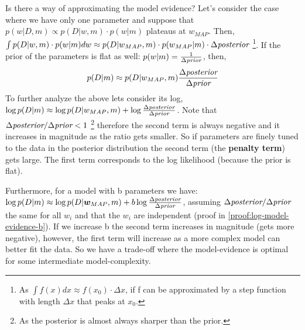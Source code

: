 Is there a way of approximating the model evidence? Let's consider the case where we have only one parameter and suppose that $p(w|D,m) \propto p(D|w,m) \cdot p(w|m)$ plateaus at $w_{MAP}$. Then, $\int p(D|w,m) \cdot p(w|m) dw \approx p(D| w_{MAP} , m) \cdot p(w_{MAP} |m) \cdot \Delta \textit{posterior}$ \footnote{As $\int f(x) dx \approx f(x_{0}) \cdot \Delta x$, if f can be approximated by a step function with length $\Delta x$ that peaks at $x_{0}$.}. If the prior of the parameters is flat as well: $p(w |m) = \frac{1}{\Delta \textit{prior}}$, then, 
\begin{equation}
    p(D|m) \approx p(D| w_{MAP} , m) \frac{\Delta \textit{posterior}}{\Delta \textit{prior}}
\end{equation}
To further analyze the above lets consider its log, $\log p(D|m) \approx \log p(D| w_{MAP} , m) + \log \frac{\Delta \textit{posterior}}{\Delta \textit{prior}}$. Note that $\Delta \textit{posterior} / \Delta \textit{prior} < 1$ \footnote{As the posterior is almost always sharper than the prior.} therefore the second term is always negative and it increases in magnitude as the ratio gets smaller. So if parameters are finely tuned to the data in the posterior distribution the second term (the \textbf{penalty term}) gets large. The first term corresponds to the log likelihood (because the prior is flat).

Furthermore, for a model with b parameters we have: $\log p(D|m) \approx \log p(D| \bm{w}_{MAP} , m) + b \log \frac{\Delta \textit{posterior}}{\Delta \textit{prior}}$, assuming $\Delta \textit{posterior} / \Delta \textit{prior}$ the same for all $w_{i}$ and that the $w_{i}$ are independent (proof in \cref{proof:log-model-evidence-b}). If we increase b the second term increases in magnitude (gets more negative), however, the first term will increase as a more complex model can better fit the data. So we have a trade-off where the model-evidence is optimal for some intermediate model-complexity. 

